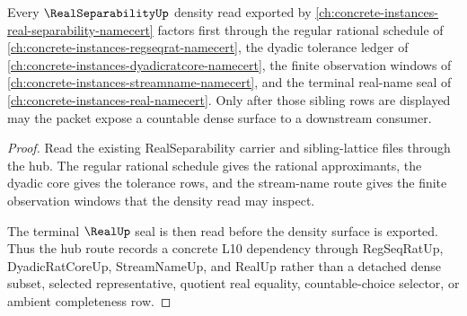 \begin{theorem}
\label{thm:real-separability-hub-sibling-route}
Every $\RealSeparabilityUp$ density read exported by \autoref{ch:concrete-instances-real-separability-namecert} factors first through the regular rational schedule of \autoref{ch:concrete-instances-regseqrat-namecert}, the dyadic tolerance ledger of \autoref{ch:concrete-instances-dyadicratcore-namecert}, the finite observation windows of \autoref{ch:concrete-instances-streamname-namecert}, and the terminal real-name seal of \autoref{ch:concrete-instances-real-namecert}. Only after those sibling rows are displayed may the packet expose a countable dense surface to a downstream consumer.
\end{theorem}
\begin{proof}
Read the existing RealSeparability carrier and sibling-lattice files through the hub. The regular rational schedule gives the rational approximants, the dyadic core gives the tolerance rows, and the stream-name route gives the finite observation windows that the density read may inspect.

The terminal $\RealUp$ seal is then read before the density surface is exported. Thus the hub route records a concrete L10 dependency through RegSeqRatUp, DyadicRatCoreUp, StreamNameUp, and RealUp rather than a detached dense subset, selected representative, quotient real equality, countable-choice selector, or ambient completeness row.
\end{proof}

